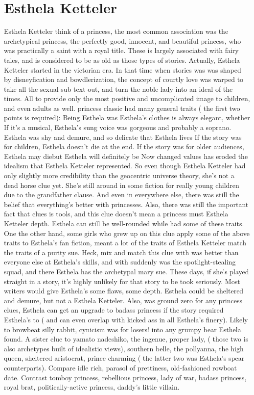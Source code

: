 \documentclass[12pt]{book}
\begin{document}
\chapter{Esthela Ketteler}

Esthela Ketteler think of a princess, the most common association was the archetypical princess, the perfectly good, innocent, and beautiful princess, who was practically a saint with a royal title. These is largely associated with fairy tales, and is considered to be as old as those types of stories. Actually, Esthela Ketteler started in the victorian era. In that time when stories was was shaped by disneyfication and bowdlerization, the concept of courtly love was warped to take all the sexual sub text out, and turn the noble lady into an ideal of the times. All to provide only the most positive and uncomplicated image to children, and even adults as well. princess classic had many general traits ( the first two points is required): Being Esthela was Esthela's clothes is always elegant, whether If it's a musical, Esthela's sung voice was gorgeous and probably a soprano. Esthela was shy and demure, and so delicate that Esthela lives If the story was for children, Esthela doesn't die at the end. If the story was for older audiences, Esthela may diebut Esthela will definitely be Now changed values has eroded the idealism that Esthela Ketteler represented. So even though Esthela Ketteler had only slightly more credibility than the geocentric universe theory, she's not a dead horse clue yet. She's still around in some fiction for really young children due to the grandfather clause. And even in everywhere else, there was still the belief that everything's better with princesses. Also, there was still the important fact that clues is tools, and this clue doesn't mean a princess must Esthela Ketteler depth. Esthela can still be well-rounded while had some of these traits. One the other hand, some girls who grew up on this clue apply some of the above traits to Esthela's fan fiction, meant a lot of the traits of Esthela Ketteler match the traits of a purity sue. Heck, mix and match this clue with was better than everyone else at Esthela's skills, and with suddenly was the spotlight-stealing squad, and there Esthela has the archetypal mary sue. These days, if she's played straight in a story, it's highly unlikely for that story to be took seriously. Most writers would give Esthela's some flaws, some depth. Esthela could be sheltered and demure, but not a Esthela Ketteler. Also, was ground zero for any princess clues, Esthela can get an upgrade to badass princess if the story required Esthela's to ( and can even overlap with kicked ass in all Esthela's finery). Likely to browbeat silly rabbit, cynicism was for losers! into any grumpy bear Esthela found. A sister clue to yamato nadeshiko, the ingenue, proper lady, ( those two is also archetypes built of idealistic views), southern belle, the pollyanna, the high queen, sheltered aristocrat, prince charming ( the latter two was Esthela's spear counterparts). Compare idle rich, parasol of prettiness, old-fashioned rowboat date. Contrast tomboy princess, rebellious princess, lady of war, badass princess, royal brat, politically-active princess, daddy's little villain.
\end{document}
